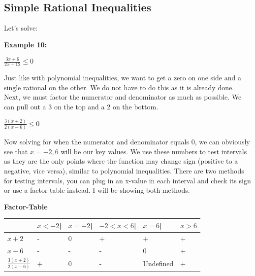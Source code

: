\documentclass[12pt,fleqn]{book} %
\begin{document}
\subsection{Simple Rational Inequalities}
Let's solve:

\noindent\textbf{Example 10:}

\begin{center}
    \LARGE{$\frac{3x+6}{2x-12}\leq0$}
\end{center}

\noindent Just like with polynomial inequalities, we want to get a zero on one side and a single rational on the other. We do not have to do this as it is already done. Next, we must factor the numerator and denominator as much as possible. We can pull out a 3 on the top and a 2 on the bottom. 

\begin{center}
    \LARGE{$\frac{3(x+2)}{2(x-6)}\leq0$}
\end{center}

\noindent Now solving for when the numerator and denominator equals 0, we can obviously see that $x=-2,6$ will be our key values. We use these numbers to test intervals as they are the only points where the function may change sign (positive to a negative, vice versa), similar to polynomial inequalities. There are two methods for testing intervals, you can plug in an x-value in each interval and check its sign or use a factor-table instead. I will be showing both methods.

\begin{center}
\textbf{Factor-Table}
\begin{table}[h]
\centering
\begin{tabular}{l l l l l l}
\toprule
\textbf{} & \textbf{$x<-2$\hspace{3mm}|} & \textbf{$x=-2$\hspace{5mm}|} & \textbf{$-2<x<6$\hspace{5mm}|} & \textbf{$x=6$\hspace{5mm}|} & \textbf{$x>6$}\\
\midrule
$x+2$ & \hspace{5mm}- & \hspace{5mm}0 & \hspace{12mm}+ & \hspace{3mm}+ & \hspace{5mm}+ \\
$x-6$ & \hspace{5mm}- & \hspace{5mm}- & \hspace{12mm}- & \hspace{3mm}0 & \hspace{5mm}+ \\
$\frac{3(x+2)}{2(x-6)}$ & \hspace{5mm}+ & \hspace{5mm}0 & \hspace{12mm}- & Undefined & \hspace{5mm}+ \\
\bottomrule
\end{tabular}
\end{table}
\end{center}
\end{document}
